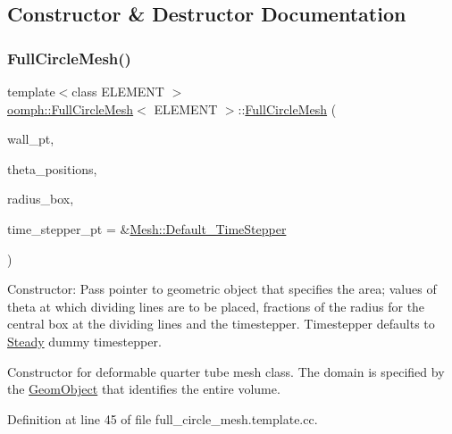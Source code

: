 \subsection{Constructor \& Destructor Documentation}
\mbox{\label{classoomph_1_1FullCircleMesh_acf4dee3c3072751597d7897176b1e7f1}} 
\subsubsection{\texorpdfstring{Full\+Circle\+Mesh()}{FullCircleMesh()}}
{\footnotesize\ttfamily template$<$class E\+L\+E\+M\+E\+NT $>$ \\
\hyperlink{classoomph_1_1FullCircleMesh}{oomph\+::\+Full\+Circle\+Mesh}$<$ E\+L\+E\+M\+E\+NT $>$\+::\hyperlink{classoomph_1_1FullCircleMesh}{Full\+Circle\+Mesh} (\begin{DoxyParamCaption}\item[{\hyperlink{classoomph_1_1GeomObject}{Geom\+Object} $\ast$}]{wall\+\_\+pt,  }\item[{const \hyperlink{classoomph_1_1Vector}{Vector}$<$ double $>$ \&}]{theta\+\_\+positions,  }\item[{const \hyperlink{classoomph_1_1Vector}{Vector}$<$ double $>$ \&}]{radius\+\_\+box,  }\item[{\hyperlink{classoomph_1_1TimeStepper}{Time\+Stepper} $\ast$}]{time\+\_\+stepper\+\_\+pt = {\ttfamily \&\hyperlink{classoomph_1_1Mesh_a12243d0fee2b1fcee729ee5a4777ea10}{Mesh\+::\+Default\+\_\+\+Time\+Stepper}} }\end{DoxyParamCaption})}



Constructor\+: Pass pointer to geometric object that specifies the area; values of theta at which dividing lines are to be placed, fractions of the radius for the central box at the dividing lines and the timestepper. Timestepper defaults to \hyperlink{classoomph_1_1Steady}{Steady} dummy timestepper. 

Constructor for deformable quarter tube mesh class. The domain is specified by the \hyperlink{classoomph_1_1GeomObject}{Geom\+Object} that identifies the entire volume. 

Definition at line 45 of file full\+\_\+circle\+\_\+mesh.\+template.\+cc.



